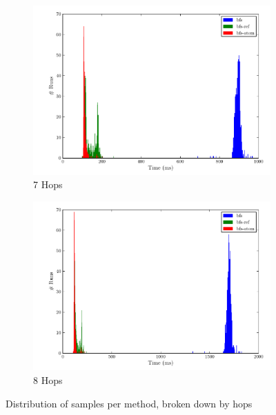 				\begin{figure}[H]
					\ContinuedFloat
					\begin{subfigure}[b]{.5\linewidth}
						\includegraphics[scale=0.45]{figures/charts/7_hops.pdf}
						\caption{7 Hops}
						\label{subfig:7-hops}
					\end{subfigure}
					\begin{subfigure}[b]{.5\linewidth}
						\includegraphics[scale=0.45]{figures/charts/8_hops.pdf}
						\caption{8 Hops}
						\label{subfig:8-hops}
					\end{subfigure}
					
					\caption{Distribution of samples per method, broken down by hops}
					\label{fig:distribution-hops}
				\end{figure}
				
